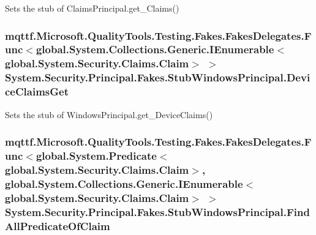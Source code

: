 Sets the stub of Claims\-Principal.\-get\-\_\-\-Claims()

\hypertarget{class_system_1_1_security_1_1_principal_1_1_fakes_1_1_stub_windows_principal_ab794a7e009fb0ebf290e48db2000ad76}{
\subsubsection[{Device\-Claims\-Get}]{\setlength{\rightskip}{0pt plus 5cm}mqttf.\-Microsoft.\-Quality\-Tools.\-Testing.\-Fakes.\-Fakes\-Delegates.\-Func$<$global.\-System.\-Collections.\-Generic.\-I\-Enumerable$<$global.\-System.\-Security.\-Claims.\-Claim$>$ $>$ System.\-Security.\-Principal.\-Fakes.\-Stub\-Windows\-Principal.\-Device\-Claims\-Get}}\label{class_system_1_1_security_1_1_principal_1_1_fakes_1_1_stub_windows_principal_ab794a7e009fb0ebf290e48db2000ad76}


Sets the stub of Windows\-Principal.\-get\-\_\-\-Device\-Claims()

\hypertarget{class_system_1_1_security_1_1_principal_1_1_fakes_1_1_stub_windows_principal_a0efdfe17101396d622b97d3b69c0992c}{
\subsubsection[{Find\-All\-Predicate\-Of\-Claim}]{\setlength{\rightskip}{0pt plus 5cm}mqttf.\-Microsoft.\-Quality\-Tools.\-Testing.\-Fakes.\-Fakes\-Delegates.\-Func$<$global.\-System.\-Predicate$<$global.\-System.\-Security.\-Claims.\-Claim$>$, global.\-System.\-Collections.\-Generic.\-I\-Enumerable$<$global.\-System.\-Security.\-Claims.\-Claim$>$ $>$ System.\-Security.\-Principal.\-Fakes.\-Stub\-Windows\-Principal.\-Find\-All\-Predicate\-Of\-Claim}}\label{class_system_1_1_security_1_1_principal_1_1_fakes_1_1_stub_windows_principal_a0efdfe17101396d622b97d3b69c0992c}


